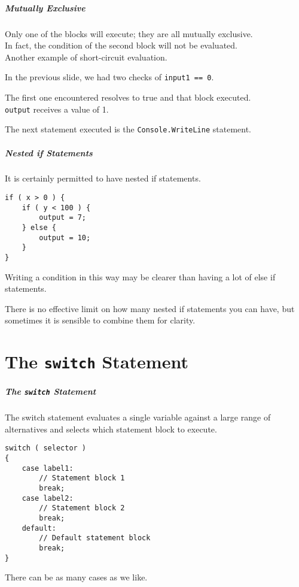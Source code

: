 \begin{frame}
\frametitle{Mutually Exclusive}

Only one of the blocks will execute; they are all mutually exclusive.\\
\quad In fact, the condition of the second block will not be evaluated.\\
\quad Another example of short-circuit evaluation.

In the previous slide, we had two checks of \texttt{input1 == 0}.

The first one encountered resolves to true and that block executed.\\
\quad \texttt{output} receives a value of 1.

The next statement executed is the \texttt{Console.WriteLine} statement.

\end{frame}

\begin{frame}[fragile]
\frametitle{Nested if Statements}
It is certainly permitted to have \alert{nested} if statements.

\begin{verbatim}
if ( x > 0 ) {
    if ( y < 100 ) {
        output = 7;
    } else {
        output = 10;
    }
}
\end{verbatim}

Writing a condition in this way may be clearer than having a lot of else if statements.

There is no effective limit on how many nested if statements you can have, but sometimes it is sensible to combine them for clarity.

\end{frame}

\part{The \texttt{switch} Statement}
\begin{frame}\partpage\end{frame}

\begin{frame}[fragile]
\frametitle{The \texttt{switch} Statement}

The switch statement evaluates a single variable against a large range of alternatives and selects which statement block to execute.

\begin{verbatim}
switch ( selector )
{
    case label1:
        // Statement block 1
        break;
    case label2:
        // Statement block 2
        break;
    default:
        // Default statement block
        break;
}
\end{verbatim}

There can be as many cases as we like.

\end{frame}

